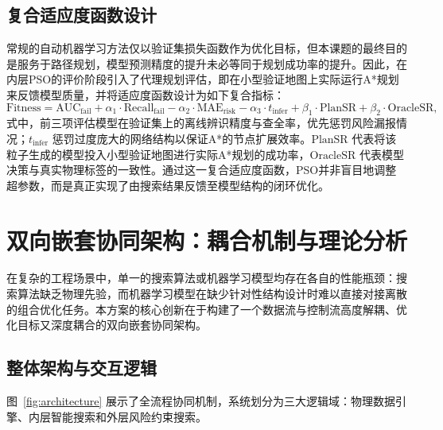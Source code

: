 \documentclass[12pt, a4paper]{article}
\begin{document}
\subsection{复合适应度函数设计}
常规的自动机器学习方法仅以验证集损失函数作为优化目标，但本课题的最终目的是服务于路径规划，模型预测精度的提升未必等同于规划成功率的提升。因此，在内层PSO的评价阶段引入了代理规划评估，即在小型验证地图上实际运行A*规划来反馈模型质量，并将适应度函数设计为如下复合指标：
\begin{equation}
    \text{Fitness} = \text{AUC}_{\text{fail}} + \alpha_1 \cdot \text{Recall}_{\text{fail}} - \alpha_2 \cdot \text{MAE}_{\text{risk}} - \alpha_3 \cdot t_{\text{infer}} + \beta_1 \cdot \text{PlanSR} + \beta_2 \cdot \text{OracleSR},
\end{equation}
式中，前三项评估模型在验证集上的离线辨识精度与查全率，优先惩罚风险漏报情况；\(t_{\text{infer}}\) 惩罚过度庞大的网络结构以保证A*的节点扩展效率。\(\text{PlanSR}\) 代表将该粒子生成的模型投入小型验证地图进行实际A*规划的成功率，\(\text{OracleSR}\) 代表模型决策与真实物理标签的一致性。通过这一复合适应度函数，PSO并非盲目地调整超参数，而是真正实现了由搜索结果反馈至模型结构的闭环优化。

\section{双向嵌套协同架构：耦合机制与理论分析}

在复杂的工程场景中，单一的搜索算法或机器学习模型均存在各自的性能瓶颈：搜索算法缺乏物理先验，而机器学习模型在缺少针对性结构设计时难以直接对接离散的组合优化任务。本方案的核心创新在于构建了一个数据流与控制流高度解耦、优化目标又深度耦合的双向嵌套协同架构。

\subsection{整体架构与交互逻辑}

图~\ref{fig:architecture} 展示了全流程协同机制，系统划分为三大逻辑域：物理数据引擎、内层智能搜索和外层风险约束搜索。
\end{document}

